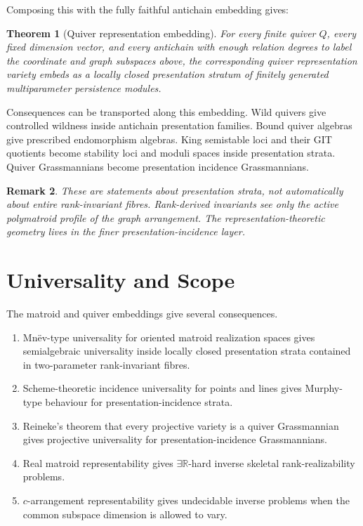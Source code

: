 \documentclass[11pt]{article}
\newtheorem{theorem}{Theorem}[section]
\newtheorem{remark}[theorem]{Remark}
\begin{document}
Composing this with the fully faithful antichain embedding gives:

\begin{theorem}[Quiver representation embedding]
For every finite quiver \(Q\), every fixed dimension vector, and every antichain with enough relation degrees to label the coordinate and graph subspaces above, the corresponding quiver representation variety embeds as a locally closed presentation stratum of finitely generated multiparameter persistence modules.
\end{theorem}

Consequences can be transported along this embedding. Wild quivers give controlled wildness inside antichain presentation families. Bound quiver algebras give prescribed endomorphism algebras. King semistable loci and their GIT quotients become stability loci and moduli spaces inside presentation strata. Quiver Grassmannians become presentation incidence Grassmannians.

\begin{remark}
These are statements about presentation strata, not automatically about entire rank-invariant fibres. Rank-derived invariants see only the active polymatroid profile of the graph arrangement. The representation-theoretic geometry lives in the finer presentation-incidence layer.
\end{remark}

\section{Universality and Scope}

The matroid and quiver embeddings give several consequences.

\begin{enumerate}[label=(\roman*)]
\item Mn\"ev-type universality for oriented matroid realization spaces gives semialgebraic universality inside locally closed presentation strata contained in two-parameter rank-invariant fibres.
\item Scheme-theoretic incidence universality for points and lines gives Murphy-type behaviour for presentation-incidence strata.
\item Reineke's theorem that every projective variety is a quiver Grassmannian gives projective universality for presentation-incidence Grassmannians.
\item Real matroid representability gives \(\exists\mathbb R\)-hard inverse skeletal rank-realizability problems.
\item \(c\)-arrangement representability gives undecidable inverse problems when the common subspace dimension is allowed to vary.
\end{enumerate}
\end{document}
